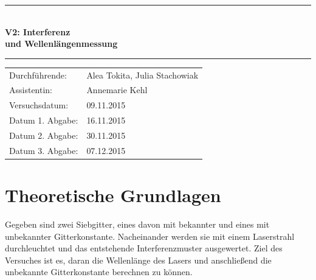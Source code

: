 \documentclass[12pt,a4paper,titlepage,headinclude,bibtotoc]{scrartcl}
\begin{document}
\begin{titlepage}
\centering

\vspace*{3cm}

\rule{\textwidth}{1pt}\\[0.5cm]
{\huge \bfseries
  V2: Interferenz\\[1.5ex]
  und Wellenlängenmessung}\\[0.5cm]
\rule{\textwidth}{1pt}

\vspace*{3cm}


\begin{Large}
\begin{tabular}{ll}
Durchführende: &  Alea Tokita, Julia Stachowiak\\
Assistentin: & Annemarie Kehl\\
 Versuchsdatum: & 09.11.2015\\
 Datum 1. Abgabe: & 16.11.2015\\
 Datum 2. Abgabe: & 30.11.2015\\
 Datum 3. Abgabe: & 07.12.2015\\
\end{tabular}
\end{Large}

\vspace*{2.5cm}

\begin{Large}
\end{Large}

\end{titlepage}

\tableofcontents

\newpage

\section{Theoretische Grundlagen}
Gegeben sind zwei Siebgitter, eines davon mit bekannter und eines mit unbekannter Gitterkonstante. Nacheinander werden sie mit einem Laserstrahl durchleuchtet und das entstehende Interferenzmuster ausgewertet. Ziel des Versuches ist es, daran die Wellenlänge des Lasers und anschließend die unbekannte Gitterkonstante berechnen zu können.
\end{document}

